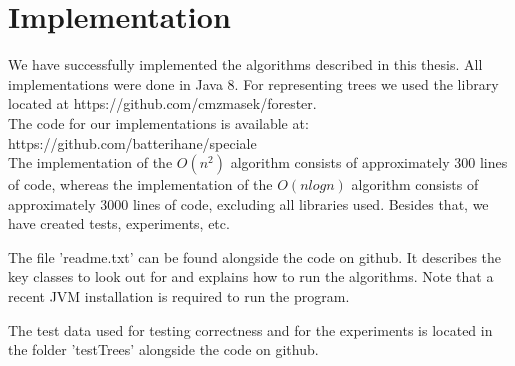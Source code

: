 \chapter{Implementation}
We have successfully implemented the algorithms described in this thesis. All implementations were done in Java 8. For representing trees we used the library located at  https://github.com/cmzmasek/forester. \\

\noindent The code for our implementations is available at: \\
https://github.com/batterihane/speciale \\

\noindent The implementation of the $O(n^2)$ algorithm consists of approximately 300 lines of code, whereas the implementation of the $O(nlogn)$ algorithm consists of approximately 3000 lines of code, excluding all libraries used. Besides that, we have created tests, experiments, etc.

The file 'readme.txt' can be found alongside the code on github. It describes the key classes to look out for and explains how to run the algorithms. Note that a recent JVM installation is required to run the program.

The test data used for testing correctness and for the experiments is located in the folder 'testTrees' alongside the code on github.